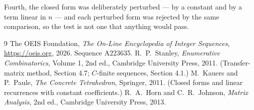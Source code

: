 \documentclass[11pt,a4paper]{article}
\theoremstyle{plain}
\theoremstyle{definition}
\begin{document}
Fourth, the closed form was deliberately perturbed --- by a constant and by a term linear in
$n$ --- and each perturbed form was rejected by the same comparison, so the test is not one
that anything would pass.

\begin{thebibliography}{9}
 The OEIS Foundation, \emph{The On-Line Encyclopedia of Integer
Sequences}, \url{https://oeis.org}, 2026. Sequence A223635.
 R.~P.~Stanley, \emph{Enumerative Combinatorics}, Volume 1, 2nd ed.,
Cambridge University Press, 2011. (Transfer-matrix method, Section 4.7; $C$-finite sequences,
Section 4.1.)
 M.~Kauers and P.~Paule, \emph{The Concrete Tetrahedron}, Springer, 2011.
(Closed forms and linear recurrences with constant coefficients.)
 R.~A.~Horn and C.~R.~Johnson, \emph{Matrix Analysis}, 2nd ed., Cambridge
University Press, 2013.
\end{thebibliography}
\end{document}
